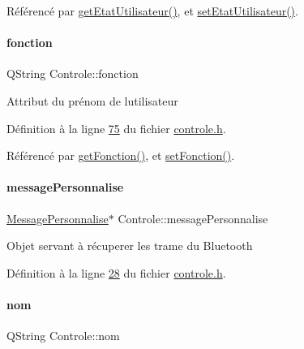 Référencé par \hyperlink{controle_8cpp_source_l00023}{get\+Etat\+Utilisateur()}, et \hyperlink{controle_8cpp_source_l00018}{set\+Etat\+Utilisateur()}.

\mbox{\label{class_controle_af733c06309ce63fb9157073574e42b00}} 
\paragraph{\texorpdfstring{fonction}{fonction}}
{\footnotesize\ttfamily Q\+String Controle\+::fonction\hspace{0.3cm}{\ttfamily [private]}}

Attribut du prénom de l\textquotesingle{}utilisateur 

Définition à la ligne \hyperlink{controle_8h_source_l00075}{75} du fichier \hyperlink{controle_8h_source}{controle.\+h}.



Référencé par \hyperlink{controle_8cpp_source_l00096}{get\+Fonction()}, et \hyperlink{controle_8cpp_source_l00092}{set\+Fonction()}.

\mbox{\label{class_controle_a6240fc19c937146243bcd950e5408481}} 
\paragraph{\texorpdfstring{message\+Personnalise}{messagePersonnalise}}
{\footnotesize\ttfamily \hyperlink{class_message_personnalise}{Message\+Personnalise}$\ast$ Controle\+::message\+Personnalise\hspace{0.3cm}{\ttfamily [private]}}

Objet servant à récuperer les trame du Bluetooth 

Définition à la ligne \hyperlink{controle_8h_source_l00028}{28} du fichier \hyperlink{controle_8h_source}{controle.\+h}.

\mbox{\label{class_controle_ad47747a49ca21434f6d43d451d3cf134}} 
\paragraph{\texorpdfstring{nom}{nom}}
{\footnotesize\ttfamily Q\+String Controle\+::nom\hspace{0.3cm}{\ttfamily [private]}}

